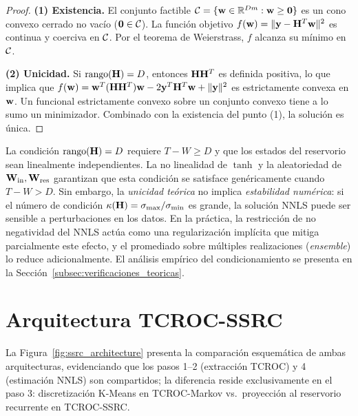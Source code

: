 \begin{proof}
\textbf{(1) Existencia.}  El conjunto factible
$\mathcal{C} = \{\mathbf{w} \in \mathbb{R}^{Dm} : \mathbf{w} \ge \mathbf{0}\}$
es un cono convexo cerrado no vacío ($\mathbf{0} \in \mathcal{C}$).  La
función objetivo $f(\mathbf{w}) = \|\mathbf{y} - \mathbf{H}^T\mathbf{w}\|^2$
es continua y coerciva en $\mathcal{C}$.  Por el teorema de
Weierstrass, $f$ alcanza su mínimo en $\mathcal{C}$.

\textbf{(2) Unicidad.}  Si $\mathrm{rango}(\mathbf{H}) = D$, entonces
$\mathbf{H}\mathbf{H}^T$ es definida positiva, lo que implica que
$f(\mathbf{w}) = \mathbf{w}^T(\mathbf{H}\mathbf{H}^T)\mathbf{w} -
2\mathbf{y}^T\mathbf{H}^T\mathbf{w} + \|\mathbf{y}\|^2$ es estrictamente
convexa en $\mathbf{w}$.  Un funcional estrictamente convexo sobre un
conjunto convexo tiene a lo sumo un minimizador.  Combinado con la
existencia del punto (1), la solución es única.
\end{proof}

\begin{remark}
\label{obs:condicion_rango}
La condición $\mathrm{rango}(\mathbf{H}) = D$ requiere $T - W \ge D$ y
que los estados del reservorio sean linealmente independientes.  La no
linealidad de $\tanh$ y la aleatoriedad de
$\mathbf{W}_{\text{in}}, \mathbf{W}_{\text{res}}$ garantizan que esta
condición se satisface genéricamente cuando $T - W > D$.  Sin embargo,
la \emph{unicidad teórica} no implica \emph{estabilidad numérica}:
si el número de condición $\kappa(\mathbf{H}) = \sigma_{\max}/\sigma_{\min}$
es grande, la solución NNLS puede ser sensible a perturbaciones en
los datos.  En la práctica, la restricción de no negatividad del NNLS
actúa como una regularización implícita que mitiga parcialmente este
efecto, y el promediado sobre múltiples realizaciones
(\textit{ensemble}) lo reduce adicionalmente.  El análisis empírico
del condicionamiento se presenta en la
Sección~\ref{subsec:verificaciones_teoricas}.
\end{remark}

\section{Arquitectura TCROC-SSRC}
\label{sec:arquitectura_tcroc_ssrc}

La Figura~\ref{fig:ssrc_architecture} presenta la comparación
esquemática de ambas arquitecturas, evidenciando que los pasos 1--2
(extracción TCROC) y 4 (estimación NNLS) son compartidos; la
diferencia reside exclusivamente en el paso 3: discretización K-Means
en TCROC-Markov vs.\ proyección al reservorio recurrente en
TCROC-SSRC.

